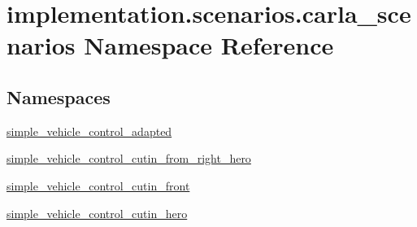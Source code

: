 \hypertarget{namespaceimplementation_1_1scenarios_1_1carla__scenarios}{}\section{implementation.\+scenarios.\+carla\+\_\+scenarios Namespace Reference}
\label{namespaceimplementation_1_1scenarios_1_1carla__scenarios}
\subsection*{Namespaces}
\begin{DoxyCompactItemize}
\item 
 \hyperlink{namespaceimplementation_1_1scenarios_1_1carla__scenarios_1_1simple__vehicle__control__adapted}{simple\+\_\+vehicle\+\_\+control\+\_\+adapted}
\item 
 \hyperlink{namespaceimplementation_1_1scenarios_1_1carla__scenarios_1_1simple__vehicle__control__cutin__from__right__hero}{simple\+\_\+vehicle\+\_\+control\+\_\+cutin\+\_\+from\+\_\+right\+\_\+hero}
\item 
 \hyperlink{namespaceimplementation_1_1scenarios_1_1carla__scenarios_1_1simple__vehicle__control__cutin__front}{simple\+\_\+vehicle\+\_\+control\+\_\+cutin\+\_\+front}
\item 
 \hyperlink{namespaceimplementation_1_1scenarios_1_1carla__scenarios_1_1simple__vehicle__control__cutin__hero}{simple\+\_\+vehicle\+\_\+control\+\_\+cutin\+\_\+hero}
\end{DoxyCompactItemize}
